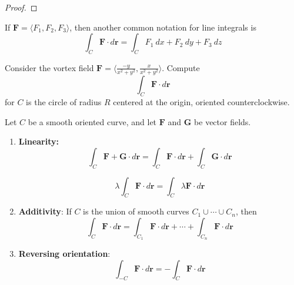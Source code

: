 \begin{proof}
\end{proof}

    
    \begin{remark} If $\bm{F} = \langle F_1, F_2, F_3 \rangle$, then another common notation for line integrals is 
    $$\int_C \bm{F} \cdot d\bm{r} = \int_C F_1 \ dx + F_2 \ dy + F_3 \ dz$$
    
    \end{remark}

\begin{example}
    Consider the vortex field $\bm{F} = \langle \frac{-y}{x^2 + y^2}, \frac{x}{x^2 + y^2} \rangle$. Compute $$\int_C \bm{F} \cdot d\bm{r}$$ for $C$ is the circle of radius $R$ centered at the origin, oriented counterclockwise.


\begin{center}
    \end{center}
\end{example}


\begin{theorem}
    Let $C$ be a smooth oriented curve, and let $\bm{F}$ and $\bm{G}$ be vector fields.
    
    \begin{enumerate}
        \item \textbf{Linearity:} $$\int_C \bm{F+G} \cdot d\bm{r} = \int_C \bm{F} \cdot d\bm{r} + \int_C \bm{G} \cdot d\bm{r}$$

        $$\lambda \int_C \bm{F} \cdot d\bm{r} = \int_C \lambda\bm{F} \cdot d\bm{r} $$
        \item \textbf{Additivity}:  If $C$ is the union of smooth curves $C_1 \cup \cdots \cup C_n$, then 
        $$\int_C \bm{F} \cdot d\bm{r} = \int_{C_1} \bm{F} \cdot d\bm{r} + \cdots + \int_{C_n} \bm{F} \cdot d\bm{r}$$
        
        \item \textbf{Reversing orientation}:  $$\int_{-C} \bm{F} \cdot d\bm{r} =  -\int_C \bm{F} \cdot d\bm{r}$$
        
    \end{enumerate}
    
    \end{theorem}


